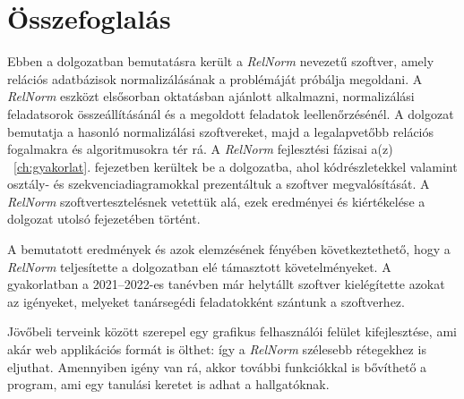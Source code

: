 \chapter{Összefoglalás}

Ebben a dolgozatban bemutatásra került a \textit{RelNorm} nevezetű szoftver, amely relációs adatbázisok normalizálásának a problémáját próbálja megoldani. A \textit{RelNorm} eszközt elsősorban oktatásban ajánlott alkalmazni, normalizálási feladatsorok összeállításánál és a megoldott feladatok leellenőrzésénél. A dolgozat bemutatja a hasonló normalizálási szoftvereket, majd a legalapvetőbb relációs fogalmakra és algoritmusokra tér rá. A \textit{RelNorm} fejlesztési fázisai a(z) ~\ref{ch:gyakorlat}. fejezetben kerültek be a dolgozatba, ahol kódrészletekkel valamint osztály- és szekvenciadiagramokkal prezentáltuk a szoftver megvalósítását. A \textit{RelNorm} szoftvertesztelésnek vetettük alá, ezek eredményei és kiértékelése a dolgozat utolsó fejezetében történt.

A bemutatott eredmények és azok elemzésének fényében következtethető, hogy a \textit{RelNorm} teljesítette a dolgozatban elé támasztott követelményeket. A gyakorlatban a 2021--2022-es tanévben már helytállt szoftver kielégítette azokat az igényeket, melyeket tanársegédi feladatokként szántunk a szoftverhez.

Jövőbeli terveink között szerepel egy grafikus felhasználói felület kifejlesztése, ami akár web applikációs formát is ölthet: így a \textit{RelNorm} szélesebb rétegekhez is eljuthat. Amennyiben igény van rá, akkor további funkciókkal is bővíthető a program, ami egy tanulási keretet is adhat a hallgatóknak.